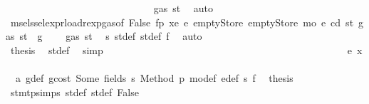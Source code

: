 \begin{isabellebody}
\ \ \ \ \ \ \ \ \ \ \ \ \ \ \ \ \ \ \ \ \ \ \ \ \ \ \isamarkupfalse%
\ {\isachardoublequoteopen}{\isasymdots}\ {\isasymle}\ gas\ st{\isacharprime}{\kern0pt}{\isacharprime}{\kern0pt}{\isachardoublequoteclose}\ \isamarkupfalse%
\ auto\isanewline
\ \ \ \ \ \ \ \ \ \ \ \ \ \ \ \ \ \ \ \ \ \ \ \ \isamarkupfalse%
\ \isamarkupfalse%
\ msel{\isacharunderscore}{\kern0pt}ssel{\isacharunderscore}{\kern0pt}expr{\isacharunderscore}{\kern0pt}load{\isacharunderscore}{\kern0pt}rexp{\isacharunderscore}{\kern0pt}gas{\isacharparenleft}{\kern0pt}{}{\isacharparenright}{\kern0pt}{\isacharbrackleft}{\kern0pt}of\ False\ fp\ xe\ e{\isacharprime}{\kern0pt}\ emptyStore\ emptyStore\ m\isactrlsub o\ e\ cd\ st{\isacharprime}{\kern0pt}\ {\isachardoublequoteopen}{\isacharparenleft}{\kern0pt}gas\ st\ {\isacharminus}{\kern0pt}\ g{\isacharparenright}{\kern0pt}{\isachardoublequoteclose}{\isacharbrackright}{\kern0pt}\ \isamarkupfalse%
\ {\isachardoublequoteopen}{\isasymdots}\ {\isasymle}\ gas\ st{\isacharprime}{\kern0pt}{\isachardoublequoteclose}\ \isamarkupfalse%
\ s{}\ st{\isacharprime}{\kern0pt}{\isacharunderscore}{\kern0pt}def\ st{\isacharprime}{\kern0pt}{\isacharprime}{\kern0pt}{\isacharunderscore}{\kern0pt}def\ f{}\ \isamarkupfalse%
\ auto\isanewline
\ \ \ \ \ \ \ \ \ \ \ \ \ \ \ \ \ \ \ \ \ \ \ \ \isamarkupfalse%
\ \isamarkupfalse%
\ {\isacharquery}{\kern0pt}thesis\ \isamarkupfalse%
\ st{\isacharprime}{\kern0pt}{\isacharunderscore}{\kern0pt}def\ \isamarkupfalse%
\ simp\isanewline
\ \ \ \ \ \ \ \ \ \ \ \ \ \ \ \ \ \ \ \ \ \ \isamarkupfalse%
\isanewline
\ \ \ \ \ \ \ \ \ \ \ \ \ \ \ \ \ \ \ \ \ \ \ \ \isamarkupfalse%
\ {\isacharparenleft}{\kern0pt}e\ x{\isacharparenright}{\kern0pt}\isanewline
\ \ \ \ \ \ \ \ \ \ \ \ \ \ \ \ \ \ \ \ \ \ \ \ \isamarkupfalse%
\ {}{\isacharparenleft}{\kern0pt}{}{\isacharparenright}{\kern0pt}\ a{}\ g{\isacharunderscore}{\kern0pt}def\ gcost\ Some\ fields\ s{}\ Method\ p{}\ m\isactrlsub o{\isacharunderscore}{\kern0pt}def\ e{\isacharprime}{\kern0pt}{\isacharunderscore}{\kern0pt}def\ s{}\ f{}\ \isamarkupfalse%
\ {\isacharquery}{\kern0pt}thesis\ \isamarkupfalse%
\ stmt{\isachardot}{\kern0pt}psimps{\isacharparenleft}{\kern0pt}{}{\isacharparenright}{\kern0pt}\ st{\isacharprime}{\kern0pt}{\isacharunderscore}{\kern0pt}def\ st{\isacharprime}{\kern0pt}{\isacharprime}{\kern0pt}{\isacharunderscore}{\kern0pt}def\ False\ \isamarkupfalse%

\end{isabellebody}
